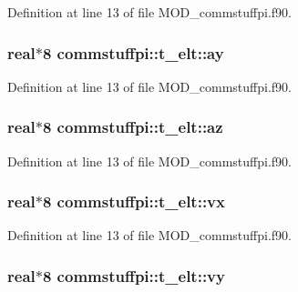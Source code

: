 Definition at line 13 of file M\-O\-D\-\_\-commstuffpi.\-f90.

\hypertarget{structcommstuffpi_1_1t__elt_a78bb0b88c673ccd83ce03bdbc0dc82d2}{
\subsubsection[{ay}]{\setlength{\rightskip}{0pt plus 5cm}real$\ast$8 commstuffpi\-::t\-\_\-elt\-::ay}}\label{structcommstuffpi_1_1t__elt_a78bb0b88c673ccd83ce03bdbc0dc82d2}


Definition at line 13 of file M\-O\-D\-\_\-commstuffpi.\-f90.

\hypertarget{structcommstuffpi_1_1t__elt_a2c89f582baf5f9c949e2ab220841ab39}{
\subsubsection[{az}]{\setlength{\rightskip}{0pt plus 5cm}real$\ast$8 commstuffpi\-::t\-\_\-elt\-::az}}\label{structcommstuffpi_1_1t__elt_a2c89f582baf5f9c949e2ab220841ab39}


Definition at line 13 of file M\-O\-D\-\_\-commstuffpi.\-f90.

\hypertarget{structcommstuffpi_1_1t__elt_aa3bc3c136824f88e8b634a100bcc8eb9}{
\subsubsection[{vx}]{\setlength{\rightskip}{0pt plus 5cm}real$\ast$8 commstuffpi\-::t\-\_\-elt\-::vx}}\label{structcommstuffpi_1_1t__elt_aa3bc3c136824f88e8b634a100bcc8eb9}


Definition at line 13 of file M\-O\-D\-\_\-commstuffpi.\-f90.

\hypertarget{structcommstuffpi_1_1t__elt_a71f01c1567b725ff07ad9afb1d30c841}{
\subsubsection[{vy}]{\setlength{\rightskip}{0pt plus 5cm}real$\ast$8 commstuffpi\-::t\-\_\-elt\-::vy}}\label{structcommstuffpi_1_1t__elt_a71f01c1567b725ff07ad9afb1d30c841}


